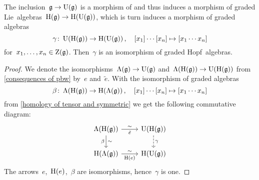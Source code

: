 \documentclass[a4paper,10pt,headings=standardclasses]{scrartcl}
\begin{document}
\begin{corollary}
  The inclusion~$\mathfrak{g} \to \operatorname{U}(\mathfrak{g})$ is a morphism of {\dgl} and thus induces a morphism of graded Lie~algebras~$\operatorname{H}(\mathfrak{g}) \to \operatorname{H}(\operatorname{U}(\mathfrak{g}))$, which is turn induces a morphism of graded algebras
  \[
    \gamma
    \colon
    \operatorname{U}(\operatorname{H}(\mathfrak{g}))
    \to
    \operatorname{H}(\operatorname{U}(\mathfrak{g})) \,,
    \quad
    [x_1] \dotsm [x_n]
    \mapsto
    [x_1 \dotsm x_n]
  \]
  for~$x_1, \dotsc, x_n \in \operatorname{Z}(\mathfrak{g})$.
  Then~$\gamma$ is an isomorphism of graded Hopf~algebras.
\end{corollary}

\begin{proof}
  We denote the isomorphisms~$\operatorname{\Lambda}(\mathfrak{g}) \to \operatorname{U}(\mathfrak{g})$ and~$\operatorname{\Lambda}(\operatorname{H}(\mathfrak{g})) \to \operatorname{U}(\operatorname{H}(\mathfrak{g}))$ from \cref{consequences of pbw} by~$e$ and~$\tilde{e}$.
  With the isomorphism of graded algebras
  \[
    \beta
    \colon
    \operatorname{\Lambda}(\operatorname{H}(\mathfrak{g}))
    \to
    \operatorname{H}(\operatorname{\Lambda}(\mathfrak{g})) \,,
    \quad
    [x_1] \dotsm [x_n]
    \mapsto
    [x_1 \dotsm x_n]
  \]
  from \cref{homology of tensor and symmetric} we get the following commutative diagram:
  \[
    \begin{tikzcd}
      \dgSymm(\homology(\glie))
      \arrow{r}[below]{\tilde{e}}[above]{\sim}
      \arrow{d}[left]{\beta}[right]{\sim}
      &
      \Univ(\homology(\glie))
      \arrow[dashed]{d}[right]{\gamma}
      \\
      \homology(\dgSymm(\glie))
      \arrow{r}[below]{\homology(e)}[above]{\sim}
      &
      \homology(\Univ(\glie))
    \end{tikzcd}
  \]
  The arrows~$e$,~$\operatorname{H}(e)$,~$\beta$ are isomorphisms, hence~$\gamma$ is one.
\end{proof}
\end{document}
